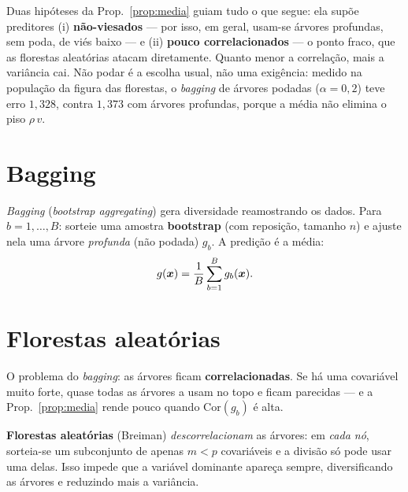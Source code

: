 \documentclass[11pt,a4paper]{article}
\begin{document}
\begin{ideia}
Duas hipóteses da Prop.~\ref{prop:media} guiam tudo o que segue: ela supõe
preditores (i) \textbf{não-viesados} --- por isso, em geral, usam-se árvores
profundas, sem poda, de viés baixo --- e (ii) \textbf{pouco correlacionados} --- o
ponto fraco, que as florestas aleatórias atacam diretamente. Quanto menor a correlação, mais a
variância cai. Não podar é a escolha usual, não uma exigência: medido na população
da figura das florestas, o \emph{bagging} de árvores podadas ($\alpha=0{,}2$) teve
erro $1{,}328$, contra $1{,}373$ com árvores profundas, porque a média não elimina o
piso $\rho\,v$.
\end{ideia}

\section{Bagging}
\emph{Bagging} (\emph{bootstrap aggregating}) gera diversidade reamostrando os
dados. Para $b=1,\dots,B$: sorteie uma amostra \textbf{bootstrap} (com reposição,
tamanho $n$) e ajuste nela uma árvore \emph{profunda} (não podada) $g_b$. A predição
é a média:
\begin{equation}\label{eq:bagging}
  g(\bm{x}) = \frac1B\sum_{b=1}^B g_b(\bm{x}).
\end{equation}

\section{Florestas aleatórias}
O problema do \emph{bagging}: as árvores ficam \textbf{correlacionadas}. Se há uma
covariável muito forte, quase todas as árvores a usam no topo e ficam parecidas ---
e a Prop.~\ref{prop:media} rende pouco quando $\mathrm{Cor}(g_b)$ é alta.

\begin{ideia}
\textbf{Florestas aleatórias} (Breiman) \emph{descorrelacionam} as árvores: em
\emph{cada nó}, sorteia-se um subconjunto de apenas $m<p$ covariáveis e a divisão
só pode usar uma delas. Isso impede que a variável dominante apareça sempre,
diversificando as árvores e reduzindo mais a variância.
\end{ideia}
\end{document}
